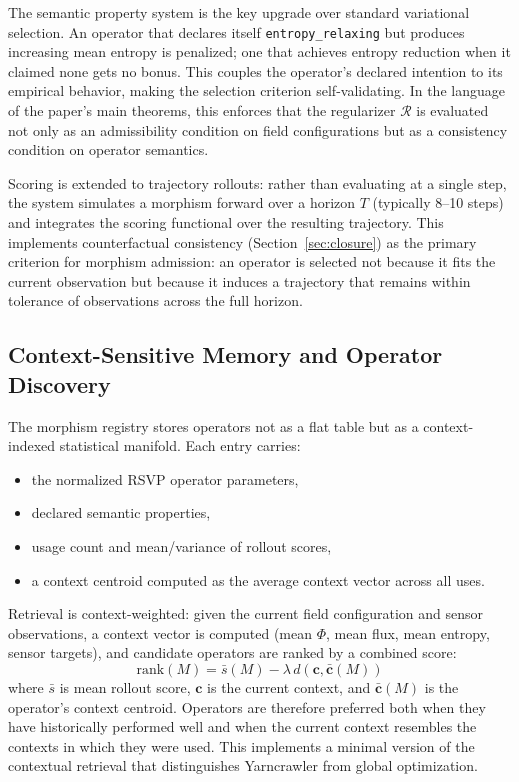 \documentclass[12pt, oneside]{article}
\begin{document}
The semantic property system is the key upgrade over standard variational selection. An
operator that declares itself \texttt{entropy\_relaxing} but produces increasing mean
entropy is penalized; one that achieves entropy reduction when it claimed none gets no
bonus. This couples the operator's declared intention to its empirical behavior, making
the selection criterion self-validating. In the language of the paper's main theorems,
this enforces that the regularizer $\mathcal{R}$ is evaluated not only as an
admissibility condition on field configurations but as a consistency condition on
operator semantics.

Scoring is extended to trajectory rollouts: rather than evaluating at a single step, the
system simulates a morphism forward over a horizon $T$ (typically 8--10 steps) and
integrates the scoring functional over the resulting trajectory. This implements
counterfactual consistency (Section~\ref{sec:closure}) as the primary criterion for
morphism admission: an operator is selected not because it fits the current observation
but because it induces a trajectory that remains within tolerance of observations across
the full horizon.

\subsection{Context-Sensitive Memory and Operator Discovery}

The morphism registry stores operators not as a flat table but as a context-indexed
statistical manifold. Each entry carries:
\begin{itemize}
\item the normalized RSVP operator parameters,
\item declared semantic properties,
\item usage count and mean/variance of rollout scores,
\item a context centroid computed as the average context vector across all uses.
\end{itemize}
Retrieval is context-weighted: given the current field configuration and sensor
observations, a context vector is computed (mean $\Phi$, mean flux, mean entropy, sensor
targets), and candidate operators are ranked by a combined score:
\[
\mathrm{rank}(M) = \bar{s}(M) - \lambda\, d(\mathbf{c}, \bar{\mathbf{c}}(M))
\]
where $\bar{s}$ is mean rollout score, $\mathbf{c}$ is the current context, and
$\bar{\mathbf{c}}(M)$ is the operator's context centroid. Operators are therefore
preferred both when they have historically performed well and when the current context
resembles the contexts in which they were used. This implements a minimal version of the
contextual retrieval that distinguishes Yarncrawler from global optimization.
\end{document}

